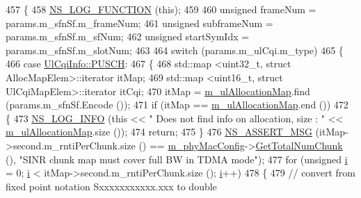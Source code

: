 \begin{DoxyCode}
457 \{
458   \hyperlink{log-macros-disabled_8h_a90b90d5bad1f39cb1b64923ea94c0761}{NS\_LOG\_FUNCTION} (\textcolor{keyword}{this});
459 
460         \textcolor{keywordtype}{unsigned} frameNum = params.m\_sfnSf.m\_frameNum;
461         \textcolor{keywordtype}{unsigned} subframeNum =  params.m\_sfnSf.m\_sfNum;
462         \textcolor{keywordtype}{unsigned} startSymIdx =  params.m\_sfnSf.m\_slotNum;
463 
464         \textcolor{keywordflow}{switch} (params.m\_ulCqi.m\_type)
465         \{
466                 \textcolor{keywordflow}{case} \hyperlink{structns3_1_1UlCqiInfo_a8241de30e4fdc8640e892ddf1e2a6c00a6d4b515df7c45a6843584459fbde26a7}{UlCqiInfo::PUSCH}:
467                 \{
468                         std::map <uint32\_t, struct AllocMapElem>::iterator itMap;
469                         std::map <uint16\_t, struct UlCqiMapElem>::iterator itCqi;
470                         itMap = \hyperlink{classns3_1_1MmWaveFlexTtiPfMacScheduler_af7da7cec8d296efb29a1fafc2a19bf48}{m\_ulAllocationMap}.find (params.m\_sfnSf.Encode ());
471                         \textcolor{keywordflow}{if} (itMap == \hyperlink{classns3_1_1MmWaveFlexTtiPfMacScheduler_af7da7cec8d296efb29a1fafc2a19bf48}{m\_ulAllocationMap}.end ())
472                         \{
473                                 \hyperlink{group__logging_gafbd73ee2cf9f26b319f49086d8e860fb}{NS\_LOG\_INFO} (\textcolor{keyword}{this} << \textcolor{stringliteral}{" Does not find info on allocation, size : 
      "} << \hyperlink{classns3_1_1MmWaveFlexTtiPfMacScheduler_af7da7cec8d296efb29a1fafc2a19bf48}{m\_ulAllocationMap}.size ());
474                                 \textcolor{keywordflow}{return};
475                         \}
476                         \hyperlink{assert_8h_aff5ece9066c74e681e74999856f08539}{NS\_ASSERT\_MSG} (itMap->second.m\_rntiPerChunk.size () == 
      \hyperlink{classns3_1_1MmWaveMacScheduler_a24d7af4971d2e500fe543cefbafa2fd9}{m\_phyMacConfig}->\hyperlink{classns3_1_1MmWavePhyMacCommon_a97e82c809a351fea9d5058ac1bb4c3c6}{GetTotalNumChunk} (), \textcolor{stringliteral}{"SINR chunk map must cover full BW in
       TDMA mode"});
477                         \textcolor{keywordflow}{for} (\textcolor{keywordtype}{unsigned} \hyperlink{bernuolliDistribution_8m_a6f6ccfcf58b31cb6412107d9d5281426}{i} = 0; \hyperlink{bernuolliDistribution_8m_a6f6ccfcf58b31cb6412107d9d5281426}{i} < itMap->second.m\_rntiPerChunk.size (); 
      \hyperlink{bernuolliDistribution_8m_a6f6ccfcf58b31cb6412107d9d5281426}{i}++)
478                         \{
479                                 \textcolor{comment}{// convert from fixed point notation Sxxxxxxxxxxx.xxx to double}

\end{DoxyCode}
